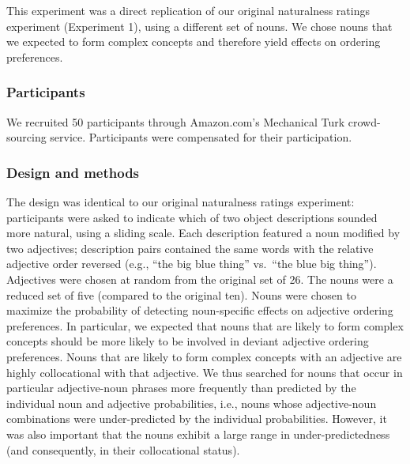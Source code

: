 \documentclass[12pt]{article}
\begin{document}
This experiment was a direct replication of our original naturalness ratings experiment (Experiment 1), using a different set of nouns. We chose nouns that we expected to form complex concepts and therefore yield effects on ordering preferences.

\subsubsection{Participants}

We recruited 50 participants through Amazon.com's Mechanical Turk crowd-sourcing service. Participants were compensated for their participation.

\subsubsection{Design and methods}

The design was identical to our original naturalness ratings experiment: participants were asked to indicate which of two object descriptions sounded more natural, using a sliding scale. Each description featured a noun modified by two adjectives; description pairs contained the same words with the relative adjective order reversed (e.g., ``the big blue thing'' vs.~``the blue big thing''). Adjectives were chosen at random from the original set of 26. The nouns were a reduced set of five (compared to the original ten). Nouns were chosen to maximize the probability of detecting noun-specific effects on adjective ordering preferences. In particular, we expected that nouns that are likely to form complex concepts should be more likely to be involved in deviant adjective ordering preferences. Nouns that are likely to form complex concepts with an adjective are highly collocational with that adjective. We thus searched for nouns that occur in particular adjective-noun phrases more frequently than predicted by the individual noun and adjective probabilities, i.e., nouns whose adjective-noun combinations were under-predicted by the individual probabilities. However, it was also important that the nouns exhibit a large range in under-predictedness (and consequently, in their collocational status). 
\end{document}

